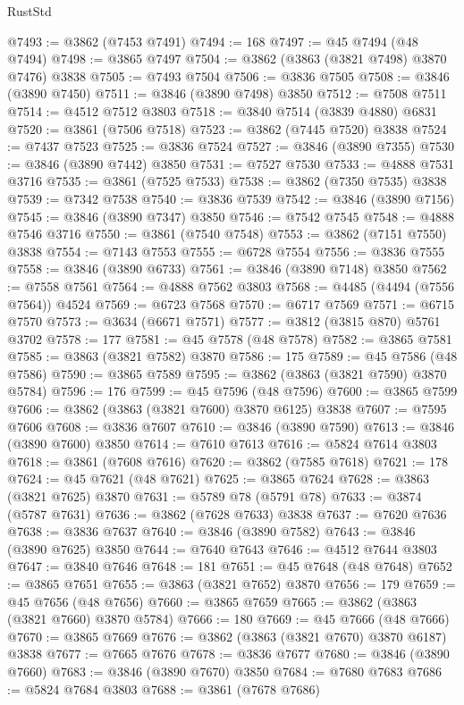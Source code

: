 \begin{lexlean}{RustStd}
\begin{coremodule}
@7493 := @3862 (@7453 @7491)
@7494 := 168
@7497 := @45 @7494 (@48 @7494)
@7498 := @3865 @7497
@7504 := @3862 (@3863 (@3821 @7498) @3870 @7476) @3838
@7505 := @7493 @7504
@7506 := @3836 @7505
@7508 := @3846 (@3890 @7450)
@7511 := @3846 (@3890 @7498) @3850
@7512 := @7508 @7511
@7514 := @4512 @7512 @3803
@7518 := @3840 @7514 (@3839 @4880) @6831
@7520 := @3861 (@7506 @7518)
@7523 := @3862 (@7445 @7520) @3838
@7524 := @7437 @7523
@7525 := @3836 @7524
@7527 := @3846 (@3890 @7355)
@7530 := @3846 (@3890 @7442) @3850
@7531 := @7527 @7530
@7533 := @4888 @7531 @3716
@7535 := @3861 (@7525 @7533)
@7538 := @3862 (@7350 @7535) @3838
@7539 := @7342 @7538
@7540 := @3836 @7539
@7542 := @3846 (@3890 @7156)
@7545 := @3846 (@3890 @7347) @3850
@7546 := @7542 @7545
@7548 := @4888 @7546 @3716
@7550 := @3861 (@7540 @7548)
@7553 := @3862 (@7151 @7550) @3838
@7554 := @7143 @7553
@7555 := @6728 @7554
@7556 := @3836 @7555
@7558 := @3846 (@3890 @6733)
@7561 := @3846 (@3890 @7148) @3850
@7562 := @7558 @7561
@7564 := @4888 @7562 @3803
@7568 := @4485 (@4494 (@7556 @7564)) @4524
@7569 := @6723 @7568
@7570 := @6717 @7569
@7571 := @6715 @7570
@7573 := @3634 (@6671 @7571)
@7577 := @3812 (@3815 @870) @5761 @3702
@7578 := 177
@7581 := @45 @7578 (@48 @7578)
@7582 := @3865 @7581
@7585 := @3863 (@3821 @7582) @3870
@7586 := 175
@7589 := @45 @7586 (@48 @7586)
@7590 := @3865 @7589
@7595 := @3862 (@3863 (@3821 @7590) @3870 @5784)
@7596 := 176
@7599 := @45 @7596 (@48 @7596)
@7600 := @3865 @7599
@7606 := @3862 (@3863 (@3821 @7600) @3870 @6125) @3838
@7607 := @7595 @7606
@7608 := @3836 @7607
@7610 := @3846 (@3890 @7590)
@7613 := @3846 (@3890 @7600) @3850
@7614 := @7610 @7613
@7616 := @5824 @7614 @3803
@7618 := @3861 (@7608 @7616)
@7620 := @3862 (@7585 @7618)
@7621 := 178
@7624 := @45 @7621 (@48 @7621)
@7625 := @3865 @7624
@7628 := @3863 (@3821 @7625) @3870
@7631 := @5789 @78 (@5791 @78)
@7633 := @3874 (@5787 @7631)
@7636 := @3862 (@7628 @7633) @3838
@7637 := @7620 @7636
@7638 := @3836 @7637
@7640 := @3846 (@3890 @7582)
@7643 := @3846 (@3890 @7625) @3850
@7644 := @7640 @7643
@7646 := @4512 @7644 @3803
@7647 := @3840 @7646
@7648 := 181
@7651 := @45 @7648 (@48 @7648)
@7652 := @3865 @7651
@7655 := @3863 (@3821 @7652) @3870
@7656 := 179
@7659 := @45 @7656 (@48 @7656)
@7660 := @3865 @7659
@7665 := @3862 (@3863 (@3821 @7660) @3870 @5784)
@7666 := 180
@7669 := @45 @7666 (@48 @7666)
@7670 := @3865 @7669
@7676 := @3862 (@3863 (@3821 @7670) @3870 @6187) @3838
@7677 := @7665 @7676
@7678 := @3836 @7677
@7680 := @3846 (@3890 @7660)
@7683 := @3846 (@3890 @7670) @3850
@7684 := @7680 @7683
@7686 := @5824 @7684 @3803
@7688 := @3861 (@7678 @7686)

\end{coremodule}
\end{lexlean}
